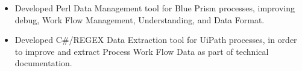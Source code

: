 \documentclass[letterpaper]{twentysecondcv} %
\begin{document}
\begin{twenty}
{\begin{itemize}
\begin{itemize}
                    \item Developed Perl Data Management tool for Blue Prism processes, improving debug, Work Flow Management, Understanding, and Data Format.
        
                    \item Developed C\#/REGEX Data Extraction tool for UiPath processes, in order to improve and extract Process Work Flow Data as part of technical documentation.
                    
                \end{itemize}
            \end{itemize}
        }

\end{twenty}

\newpage
\sidebar
\end{document}

